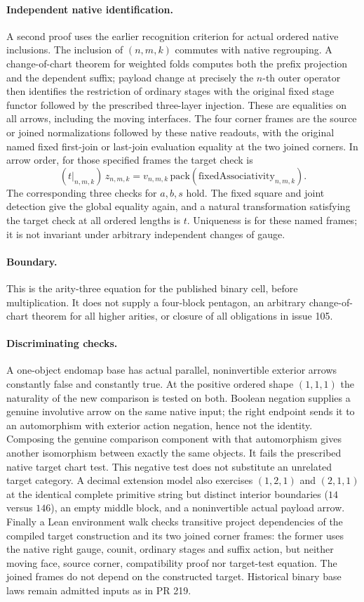 \paragraph{Independent native identification.} A second proof uses
the earlier recognition criterion for actual ordered native inclusions.
The inclusion of $(n,m,k)$ commutes with native regrouping. A change-of-chart
theorem for weighted folds computes both the prefix projection and the
dependent suffix; payload change at precisely the $n$-th outer operator
then identifies the restriction of ordinary stages with the original fixed
stage functor followed by the prescribed three-layer injection. These are
equalities on all arrows, including the moving interfaces. The four
corner frames are the source or joined normalizations followed by these
native readouts, with the original named fixed first-join or last-join
evaluation equality at the two joined corners. In arrow order, for those
specified frames the target check is
\[
  (t|_{n,m,k})\, z_{n,m,k}=v_{n,m,k}\,\mathrm{pack}(\mathrm{fixedAssociativity}_{n,m,k}).
\]
The corresponding three checks for $a,b,s$ hold. The fixed square and
joint detection give the global equality again, and a natural
transformation satisfying the target check at all ordered lengths is
$t$. Uniqueness is for these named frames; it is not invariant under
arbitrary independent changes of gauge.

\paragraph{Boundary.} This is the arity-three equation for the published
binary cell, before multiplication. It does not supply a four-block pentagon,
an arbitrary change-of-chart theorem for all higher arities, or closure
of all obligations in issue 105.

\paragraph{Discriminating checks.} A one-object endomap base has actual
parallel, noninvertible exterior arrows constantly false and constantly
true. At the positive ordered shape $(1,1,1)$ the naturality of the new
comparison is tested on both. Boolean negation supplies a genuine
involutive arrow on the same native input; the right endpoint sends it
to an automorphism with exterior action negation, hence not the identity.
Composing the genuine comparison component with that automorphism gives
another isomorphism between exactly the same objects. It fails the
prescribed native target chart test. This negative test does not
substitute an unrelated target category. A decimal extension model also
exercises $(1,2,1)$ and $(2,1,1)$ at the identical complete primitive
string but distinct interior boundaries ($14$ versus $146$), an empty
middle block, and a noninvertible actual payload arrow. Finally a Lean
environment walk checks transitive project dependencies of the compiled
target construction and its two joined corner frames: the former uses
the native right gauge, counit, ordinary stages and suffix action, but
neither moving face, source corner, compatibility proof nor target-test
equation. The joined frames do not depend on the constructed target.
Historical binary base laws remain admitted inputs as in PR 219.
